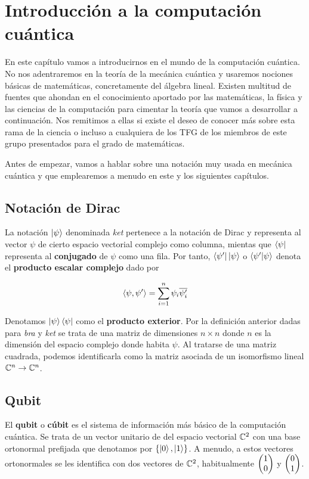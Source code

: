 \chapter{Introducción a la computación cuántica}

En este capítulo vamos a introducirnos en el mundo de la computación cuántica. No nos adentraremos en la teoría de la mecánica cuántica y usaremos nociones básicas de matemáticas, concretamente del álgebra lineal. Existen multitud de fuentes que ahondan en el conocimiento aportado por las matemáticas, la física y las ciencias de la computación para cimentar la teoría que vamos a desarrollar a continuación. Nos remitimos a ellas si existe el deseo de conocer más sobre esta rama de la ciencia o incluso a cualquiera de los TFG de los miembros de este grupo presentados para el grado de matemáticas.

Antes de empezar, vamos a hablar sobre una notación muy usada en mecánica cuántica y que emplearemos a menudo en este y los siguientes capítulos.

\section{Notación de Dirac}

La notación $\left|\psi\right\rangle$ denominada \textit{ket} pertenece a la notación de Dirac y representa al vector $\psi$ de cierto espacio vectorial complejo como columna, mientas que $\left\langle\psi\right|$ representa al \textbf{conjugado} de $\psi$ como una fila. Por tanto, $\left\langle\psi'\right|\left|\psi\right\rangle$ o $\left\langle\psi'|\psi\right\rangle$ denota el \textbf{producto escalar complejo} dado por

\begin{equation}
\langle\psi,\psi'\rangle=\sum_{i=1}^{n}\psi_i\overline{\psi'_i}
\end{equation}

Denotamos $\left|\psi\right\rangle\left\langle\psi\right|$ como el \textbf{producto exterior}. Por la definición anterior dadas para \textit{bra} y \textit{ket} se trata de una matriz de dimensiones $n\times n$ donde $n$ es la dimensión del espacio complejo donde habita $\psi$. Al tratarse de una matriz cuadrada, podemos identificarla como la matriz asociada de un isomorfismo lineal $\mathbb{C}^n\to\mathbb{C}^n$.

\section{Qubit}

El \textbf{qubit} o \textbf{cúbit} es el sistema de información más básico de la computación cuántica. Se trata de un vector unitario de del espacio vectorial $\mathbb{C}^2$ con una base ortonormal prefijada que denotamos por $\{\left|0\right\rangle,\left|1\right\rangle\}$. A menudo, a estos vectores ortonormales se les identifica con dos vectores de $\mathbb{C}^2$, habitualmente $\begin{pmatrix} 1 \\ 0 \end{pmatrix}$ y $\begin{pmatrix} 0 \\ 1 \end{pmatrix}$.

